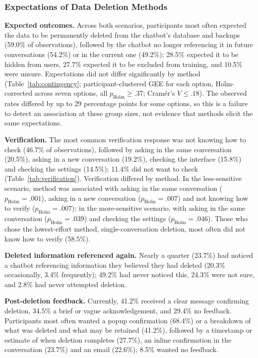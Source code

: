 \documentclass[conference,compsoc]{IEEEtran}
\begin{document}
\subsubsection{Expectations of Data Deletion Methods}

\textbf{Expected outcomes.} Across both scenarios, participants most often expected the data to be permanently deleted from the chatbot's database and backups (59.0\% of observations), followed by the chatbot no longer referencing it in future conversations (54.2\%) or in the current one (49.2\%); 28.5\% expected it to be hidden from users, 27.7\% expected it to be excluded from training, and 10.5\% were unsure. Expectations did not differ significantly by method (Table~\ref{tab:contingency}; participant-clustered GEE for each option, Holm-corrected across seven options, all $p_{\mathrm{Holm}}\geq.37$; Cram\'er's $V\leq.18$). The observed rates differed by up to 29 percentage points for some options, so this is a failure to detect an association at these group sizes, not evidence that methods elicit the same expectations.

\textbf{Verification.} The most common verification response was not knowing how to check (46.7\% of observations), followed by asking in the same conversation (20.5\%), asking in a new conversation (19.2\%), checking the interface (15.8\%) and checking the settings (14.5\%); 11.4\% did not want to check (Table~\ref{tab:verification}). Verification differed by method. In the less-sensitive scenario, method was associated with asking in the same conversation ($p_{\mathrm{Holm}}=.001$), asking in a new conversation ($p_{\mathrm{Holm}}=.007$) and not knowing how to verify ($p_{\mathrm{Holm}}=.007$); in the more-sensitive scenario, with asking in the same conversation ($p_{\mathrm{Holm}}=.039$) and checking the settings ($p_{\mathrm{Holm}}=.046$). Those who chose the lowest-effort method, single-conversation deletion, most often did not know how to verify (58.5\%).

\textbf{Deleted information referenced again.} Nearly a quarter (23.7\%) had noticed a chatbot referencing information they believed they had deleted (20.3\% occasionally, 3.4\% frequently); 49.2\% had never noticed this, 24.3\% were not sure, and 2.8\% had never attempted deletion.

\textbf{Post-deletion feedback.} Currently, 41.2\% received a clear message confirming deletion, 34.5\% a brief or vague acknowledgement, and 29.4\% no feedback. Participants most often wanted a popup confirmation (68.4\%) or a breakdown of what was deleted and what may be retained (41.2\%), followed by a timestamp or estimate of when deletion completes (27.7\%), an inline confirmation in the conversation (23.7\%) and an email (22.6\%); 8.5\% wanted no feedback.
\end{document}
